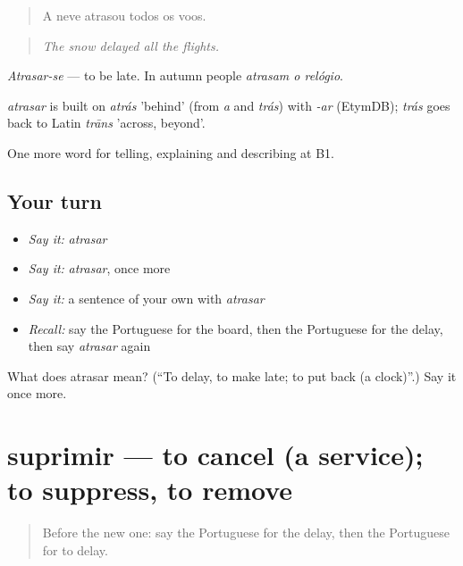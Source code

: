 \begin{quote}
A neve atrasou todos os voos.
\end{quote}

\begin{quote}
\emph{The snow delayed all the flights.}
\end{quote}

\emph{Atrasar-se} — to be late. In autumn people \emph{atrasam o relógio}.

\begin{cousinweb}
\emph{atrasar} is built on \emph{atrás} 'behind' (from \emph{a} and \emph{trás}) with \emph{-ar} (EtymDB); \emph{trás} goes back to Latin \emph{trāns} 'across, beyond'.
\end{cousinweb}

\begin{grammarlens}[title={What you've built}]
One more word for telling, explaining and describing at B1.
\end{grammarlens}

\subsection*{Your turn}
\begin{itemize}
\raggedright
  \item \emph{Say it:} \emph{atrasar}
  \item \emph{Say it:} \emph{atrasar}, once more
  \item \emph{Say it:} a sentence of your own with \emph{atrasar}
  \item \emph{Recall:} say the Portuguese for the board, then the Portuguese for the delay, then say \emph{atrasar} again
\end{itemize}

\begin{tcolorbox}[breakable,colback=teal!4,colframe=teal!35!black,title={Before you move on}]
What does atrasar mean? (\textquotedblleft{}To delay, to make late; to put back (a clock)\textquotedblright{}.) Say it once more.
\end{tcolorbox}
\section[suprimir]{suprimir — to cancel (a service); to suppress, to remove}

\label{lesson:PT-C416-suprimir}



\begin{quote}
Before the new one: say the Portuguese for the delay, then the Portuguese for to delay.
\end{quote}

